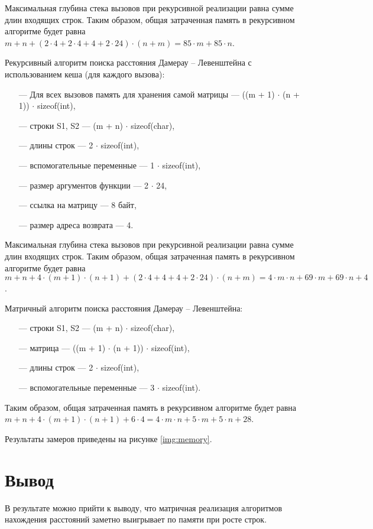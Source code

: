 Максимальная глубина стека вызовов при рекурсивной реализации равна сумме длин входящих строк. Таким образом, общая затраченная память в рекурсивном алгоритме будет равна $m + n + (2 \cdot 4 + 2 \cdot 4 + 4 + 2 \cdot 24) \cdot (n + m) = 85\cdot m + 85\cdot n$.

Рекурсивный алгоритм поиска расстояния Дамерау -- Левенштейна с использованием кеша (для каждого вызова): 

\begin{itemize}
    \item[---] Для всех вызовов память для хранения самой матрицы ---  ((m + 1) $\cdot$ (n + 1)) $\cdot$ sizeof(int),
    \item[---] строки S1, S2 --- (m + n) $\cdot$ sizeof(char),
    \item[---] длины строк --- 2 $\cdot$ sizeof(int),
    \item[---] вспомогательные переменные ---  1 $\cdot$ sizeof(int),
    \item[---] размер аргументов функции --- 2 $\cdot$ 24,
    \item[---] ссылка на матрицу --- 8 байт,
    \item[---] размер адреса возврата --- 4.
\end{itemize}
	
Максимальная глубина стека вызовов при рекурсивной реализации равна сумме длин входящих строк. Таким образом, общая затраченная память в рекурсивном алгоритме будет равна $m + n + 4 \cdot (m + 1) \cdot (n + 1) + (2 \cdot 4 + 4 + 4 + 2 \cdot 24) \cdot (n + m) = 4\cdot m\cdot n + 69\cdot m + 69\cdot n + 4$.

Матричный алгоритм поиска расстояния Дамерау -- Левенштейна: 
\begin{itemize}
    \item[---] строки S1, S2 --- (m + n) $\cdot$ sizeof(char),
    \item[---] матрица --- ((m + 1) $\cdot$ (n + 1)) $\cdot$ sizeof(int),
    \item[---] длины строк --- 2 $\cdot$ sizeof(int),
    \item[---] вспомогательные переменные --- 3 $\cdot$ sizeof(int).
\end{itemize}

Таким образом, общая затраченная память в рекурсивном алгоритме будет равна $m + n + 4 \cdot (m + 1) \cdot (n + 1) + 6 \cdot 4 = 4\cdot m\cdot n + 5\cdot m + 5\cdot n + 28$.

Результаты замеров приведены на рисунке \ref{img:memory}.


\section*{Вывод}

В результате можно прийти к выводу, что матричная реализация алгоритмов нахождения расстояний заметно выигрывает по памяти при росте строк.
